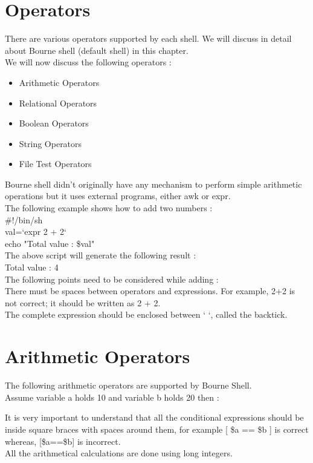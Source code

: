 \documentclass{article}
\begin{document}
\section*{Operators }
There are various operators supported by each shell. We will discuss in detail about Bourne shell (default shell) in this chapter.\\
We will now discuss the following operators :\\
\begin{itemize}
    \item Arithmetic Operators
    \item Relational Operators
    \item Boolean Operators
    \item String Operators
    \item File Test Operators
\end{itemize}
Bourne shell didn't originally have any mechanism to perform simple arithmetic operations but it uses external programs, either awk or expr.\\
The following example shows how to add two numbers :\\
\#!/bin/sh\\
val=`expr 2 + 2`\\
echo "Total value : \$val"\\
The above script will generate the following result :\\
Total value : 4\\
The following points need to be considered while adding :\\
    There must be spaces between operators and expressions. For example, 2+2 is not correct; it should be written as 2 + 2.\\
    The complete expression should be enclosed between ‘ ‘, called the backtick.\\

\section*{Arithmetic Operators}
The following arithmetic operators are supported by Bourne Shell.\\
Assume variable a holds 10 and variable b holds 20 then :
\begin{center}
\end{center}
It is very important to understand that all the conditional expressions should be inside square braces with spaces around them, for example [ \$a == \$b ] is correct whereas, [\$a==\$b] is incorrect.\\
All the arithmetical calculations are done using long integers.
\end{document}
